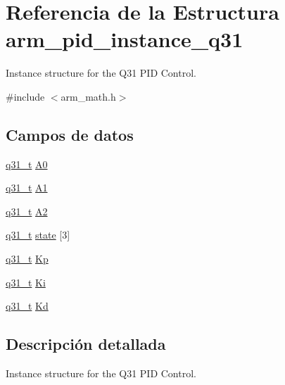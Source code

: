 \hypertarget{structarm__pid__instance__q31}{}\section{Referencia de la Estructura arm\+\_\+pid\+\_\+instance\+\_\+q31}
\label{structarm__pid__instance__q31}


Instance structure for the Q31 P\+ID Control.  




{\ttfamily \#include $<$arm\+\_\+math.\+h$>$}

\subsection*{Campos de datos}
\begin{DoxyCompactItemize}
\item 
\hyperlink{arm__math_8h_adc89a3547f5324b7b3b95adec3806bc0}{q31\+\_\+t} \hyperlink{structarm__pid__instance__q31_ab58496a4137da4c667915a5fc0ef57ef}{A0}
\item 
\hyperlink{arm__math_8h_adc89a3547f5324b7b3b95adec3806bc0}{q31\+\_\+t} \hyperlink{structarm__pid__instance__q31_aeb897c84724b56948e4222aca8d0e1f4}{A1}
\item 
\hyperlink{arm__math_8h_adc89a3547f5324b7b3b95adec3806bc0}{q31\+\_\+t} \hyperlink{structarm__pid__instance__q31_a4ae945f839719fb2c04c978724b78ebb}{A2}
\item 
\hyperlink{arm__math_8h_adc89a3547f5324b7b3b95adec3806bc0}{q31\+\_\+t} \hyperlink{structarm__pid__instance__q31_af0a2da4da9a94af652873ec7e7be4880}{state} \mbox{[}3\mbox{]}
\item 
\hyperlink{arm__math_8h_adc89a3547f5324b7b3b95adec3806bc0}{q31\+\_\+t} \hyperlink{structarm__pid__instance__q31_a6ec4b37fe2246a7e017dd07578fe5bbd}{Kp}
\item 
\hyperlink{arm__math_8h_adc89a3547f5324b7b3b95adec3806bc0}{q31\+\_\+t} \hyperlink{structarm__pid__instance__q31_a84a6c05c16369c905193da0d5fc9a7b0}{Ki}
\item 
\hyperlink{arm__math_8h_adc89a3547f5324b7b3b95adec3806bc0}{q31\+\_\+t} \hyperlink{structarm__pid__instance__q31_a213bbf14da7ea536998f611977173552}{Kd}
\end{DoxyCompactItemize}


\subsection{Descripción detallada}
Instance structure for the Q31 P\+ID Control. 

